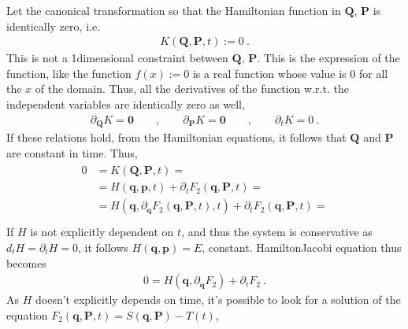 \documentclass[letterpaper,10pt,english]{jupyterBook}
\begin{document}
\sphinxAtStartPar
Let the canonical transformation so that the Hamiltonian function in \(\mathbf{Q}\), \(\mathbf{P}\) is identically zero, i.e.
\begin{equation*}
\begin{split}K(\mathbf{Q}, \mathbf{P}, t) := 0 \ .\end{split}
\end{equation*}
\sphinxAtStartPar
{} This is not a 1\sphinxhyphen{}dimensional constraint between \(\mathbf{Q}\), \(\mathbf{P}\). This is the expression of the function, like the function \(f(x) := 0 \) is a real function whose value is \(0\) for all the \(x\) of the domain. Thus, all the derivatives of the function w.r.t. the independent variables are identically zero as well,
\begin{equation*}
\begin{split}\partial_{\mathbf{Q}} K = \mathbf{0} \qquad , \qquad \partial_{\mathbf{P}} K = \mathbf{0} \qquad , \qquad \partial_t K = 0 \ .\end{split}
\end{equation*}
\sphinxAtStartPar
If these relations hold, from the Hamiltonian equations, it follows that \(\mathbf{Q}\) and \(\mathbf{P}\) are constant in time.
Thus,
\begin{equation*}
\begin{split}\begin{aligned}
  0
  & = K(\mathbf{Q}, \mathbf{P}, t) = \\
  & = H(\mathbf{q},\mathbf{p},t) + \partial_t F_2(\mathbf{q}, \mathbf{P}, t) = \\
  & = H(\mathbf{q}, \partial_\mathbf{q} F_2(\mathbf{q}, \mathbf{P}, t) ,t) + \partial_t F_2(\mathbf{q}, \mathbf{P}, t) = \\
\end{aligned}\end{split}
\end{equation*}
\sphinxAtStartPar
If \(H\) is not explicitly dependent on \(t\), and thus the system is conservative as \(d_t H = \partial_t H = 0\), it follows \(H(\mathbf{q}, \mathbf{p}) = E\), constant. Hamilton\sphinxhyphen{}Jacobi equation thus becomes
\begin{equation*}
\begin{split}0 = H\left( \mathbf{q}, \partial_{\mathbf{q}} F_2 \right) + \partial_t F_2 \ .\end{split}
\end{equation*}
\sphinxAtStartPar
As \(H\) doesn’t explicitly depends on time, it’s possible to look for a solution of the equation \(F_2(\mathbf{q}, \mathbf{P}, t) = S(\mathbf{q}, \mathbf{P}) - T(t)\),
\end{document}
